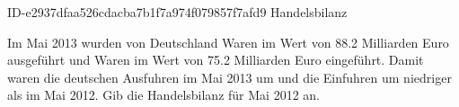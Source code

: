 \begin{exercise}
      {ID-e2937dfaa526cdacba7b1f7a974f079857f7afd9}
      {Handelsbilanz}
  \ifproblem\problem\par
    Im Mai 2013 wurden von Deutschland Waren im Wert von \num{88.2} Milliarden
    Euro ausgeführt und Waren im Wert von \num{75.2} Milliarden Euro eingeführt.
    Damit waren die deutschen Ausfuhren im Mai 2013 um  und die
    Einfuhren um  niedriger als im Mai 2012. Gib die Handelsbilanz
    für Mai 2012 an.
  \fi
\end{exercise}
